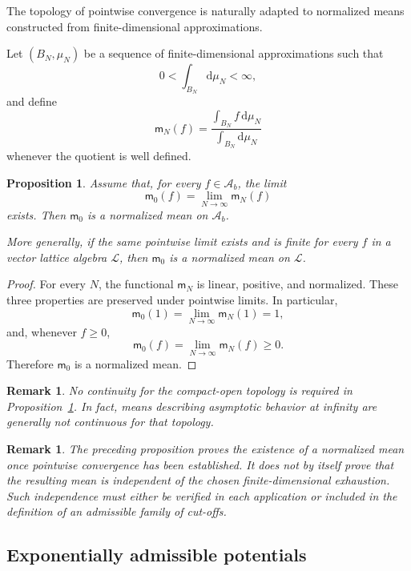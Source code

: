 \documentclass[10pt,a4paper]{amsart}
\newtheorem{Proposition}[Theorem]{Proposition}
\newtheorem{rem}[Theorem]{Remark}
\begin{document}
The topology of pointwise convergence is naturally adapted to
normalized means constructed from finite-dimensional approximations.

Let $(B_N,\mu_N)$ be a sequence of finite-dimensional approximations
such that
\[
0<\int_{B_N}\mathrm d\mu_N<\infty,
\]
and define
\[
\mathsf m_N(f)
=
\frac{
\displaystyle\int_{B_N}f\,\mathrm d\mu_N
}{
\displaystyle\int_{B_N}\mathrm d\mu_N
}
\]
whenever the quotient is well defined.

\begin{Proposition}
\label{prop:cutoff-pointwise-limit}
Assume that, for every $f\in\mathcal A_b$, the limit
\[
\mathsf m_0(f)
=
\lim_{N\to\infty}\mathsf m_N(f)
\]
exists. Then $\mathsf m_0$ is a normalized mean on $\mathcal A_b$.

More generally, if the same pointwise limit exists and is finite for
every $f$ in a vector lattice algebra $\mathcal L$, then $\mathsf m_0$
is a normalized mean on $\mathcal L$.
\end{Proposition}

\begin{proof}
For every $N$, the functional $\mathsf m_N$ is linear, positive, and
normalized. These three properties are preserved under pointwise
limits. In particular,
\[
\mathsf m_0(1)
=
\lim_{N\to\infty}\mathsf m_N(1)
=
1,
\]
and, whenever $f\geq 0$,
\[
\mathsf m_0(f)
=
\lim_{N\to\infty}\mathsf m_N(f)
\geq 0.
\]
Therefore $\mathsf m_0$ is a normalized mean.
\end{proof}

\begin{rem}
No continuity for the compact-open topology is required in
Proposition~\ref{prop:cutoff-pointwise-limit}. In fact, means describing
asymptotic behavior at infinity are generally not continuous for that
topology.
\end{rem}

\begin{rem}
The preceding proposition proves the existence of a normalized mean
once pointwise convergence has been established. It does not by itself
prove that the resulting mean is independent of the chosen
finite-dimensional exhaustion. Such independence must either be
verified in each application or included in the definition of an
admissible family of cut-offs.
\end{rem}

\subsection{Exponentially admissible potentials}
\end{document}
